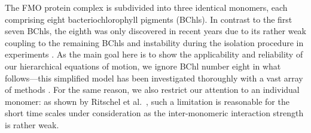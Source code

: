 
The FMO protein complex is subdivided into three identical monomers, each comprising eight bacteriochlorophyll pigments (BChls).
In contrast to the first seven BChls, the eighth was only discovered in recent years due to its rather weak coupling to the remaining BChls and instability during the isolation procedure in experiments \cite{TrCaBl09_fmo_structure,ScMuEl10_eighth}.
As the main goal here is to show the applicability and reliability of our hierarchical equations of motion, we ignore BChl number eight in what follows---this simplified model has been investigated thoroughly with a vast array of methods \cite{IsFl09_fmo,RiRoSt11_fmo}.
For the same reason, we also restrict our attention to an individual monomer: as shown by Ritschel et al.\ \cite{RiRoSt11_fmo_trimer}, such a limitation is reasonable for the short time scales under consideration as the inter-monomeric interaction strength is rather weak.


